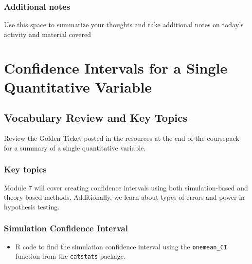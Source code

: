 \documentclass[
]{report}
\newenvironment{Shaded}{\begin{snugshade}}{\end{snugshade}}
\newcommand{\AttributeTok}[1]{\textcolor[rgb]{0.13,0.29,0.53}{#1}}
\newcommand{\CommentTok}[1]{\textcolor[rgb]{0.56,0.35,0.01}{\textit{#1}}}
\newcommand{\DecValTok}[1]{\textcolor[rgb]{0.00,0.00,0.81}{#1}}
\newcommand{\FunctionTok}[1]{\textcolor[rgb]{0.13,0.29,0.53}{\textbf{#1}}}
\newcommand{\NormalTok}[1]{#1}
\newcommand{\SpecialCharTok}[1]{\textcolor[rgb]{0.81,0.36,0.00}{\textbf{#1}}}
\newcommand{\StringTok}[1]{\textcolor[rgb]{0.31,0.60,0.02}{#1}}
\providecommand{\tightlist}{%
  \setlength{\itemsep}{0pt}\setlength{\parskip}{0pt}}
\begin{document}
\subsection{Additional notes}\label{additional-notes-2}

Use this space to summarize your thoughts and take additional notes on today's activity and material covered

\newpage

\chapter{Confidence Intervals for a Single Quantitative Variable}\label{confidence-intervals-for-a-single-quantitative-variable}

\section{Vocabulary Review and Key Topics}\label{vocabulary-review-and-key-topics-1}

Review the Golden Ticket posted in the resources at the end of the coursepack for a summary of a single quantitative variable.

\subsection{Key topics}\label{key-topics-1}

Module 7 will cover creating confidence intervals using both simulation-based and theory-based methods. Additionally, we learn about types of errors and power in hypothesis testing.

\subsection*{Simulation Confidence Interval}\label{simulation-confidence-interval}

\begin{itemize}
\tightlist
\item
  R code to find the simulation confidence interval using the \texttt{onemean\_CI} function from the \texttt{catstats} package.
\end{itemize}

\begin{Shaded}
\end{Shaded}
\end{document}
